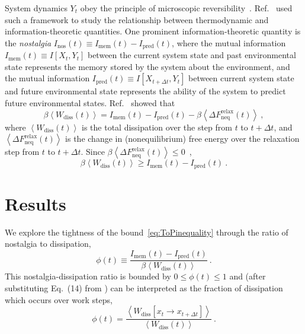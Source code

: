 \documentclass[entropy,article,
submit,
moreauthors,pdftex,10pt,a4paper]{mdpi}
\newcommand{\mem}{I_\mathrm{mem}}
\newcommand{\pred}{I_\mathrm{pred}}
\newcommand{\Nos}{I_\mathrm{nos}}
\begin{document}
System dynamics $Y_{t}$ obey the principle of microscopic reversibility~\cite{Chandler1987a}. Ref.~\cite{Still2012} used such a framework to study the relationship between thermodynamic and information-theoretic quantities. One prominent information-theoretic quantity is the \emph{nostalgia} $\Nos(t) \equiv \mem(t)-\pred(t)$, where the mutual information $\mem(t) \equiv I[X_{t},Y_{t}]$ \cite{cover2012elements} between the current system state and past environmental state represents the memory stored by the system about the environment, and the mutual information $\pred(t) \equiv I[X_{t+\Delta t},Y_{t}]$ between current system state and future environmental state represents the ability of the system to predict future environmental states. Ref.~\cite{Still2012} showed that
\begin{equation}
  \label{eq:ToP}
    \beta \left\langle W_{\mathrm{diss}}(t) \right\rangle = \mem(t) - \pred(t) - \beta \left\langle \Delta F_{\mathrm{neq}}^{\mathrm{relax}}(t) \right\rangle \ ,
\end{equation}
where $\left\langle W_{\mathrm{diss}}(t) \right\rangle$ is the total dissipation over the step from $t$ to $t+\Delta t$, and $\left\langle \Delta F_{\mathrm{neq}}^{\mathrm{relax}}(t) \right\rangle$ is the change in (nonequilibrium) free energy over the relaxation step from $t$ to $t+\Delta t$.
Since $\beta \left\langle \Delta F_{\mathrm{neq}}^{\mathrm{relax}}(t) \right\rangle \le 0$~\cite{Schnakenberg:1976p55305},
\begin{equation}
  \label{eq:ToPinequality}
  \beta \left\langle W_{\mathrm{diss}}(t) \right\rangle \ge \mem(t) - \pred(t) \ .
\end{equation}


\section{Results}

We explore the tightness of the bound~\eqref{eq:ToPinequality} through the ratio of nostalgia to dissipation,
\begin{equation}
\label{eq:phi}
\phi(t) \equiv \frac{\mem(t) - \pred(t)}{\beta \left\langle W_{\mathrm{diss}}(t) \right\rangle} \ .
\end{equation}
This nostalgia-dissipation ratio is bounded by $0 \le \phi(t) \le 1$ and (after substituting Eq.~(14) from \cite{Still2012}) can be interpreted as the fraction of dissipation which occurs over work steps,
\begin{equation}
\label{eq:phiwork}
\phi(t) = \frac{\left\langle W_{\mathrm{diss}}[x_t \rightarrow x_{t+\Delta t}] \right\rangle}{\left\langle W_{\mathrm{diss}}(t) \right\rangle} \ .
\end{equation}
\end{document}
